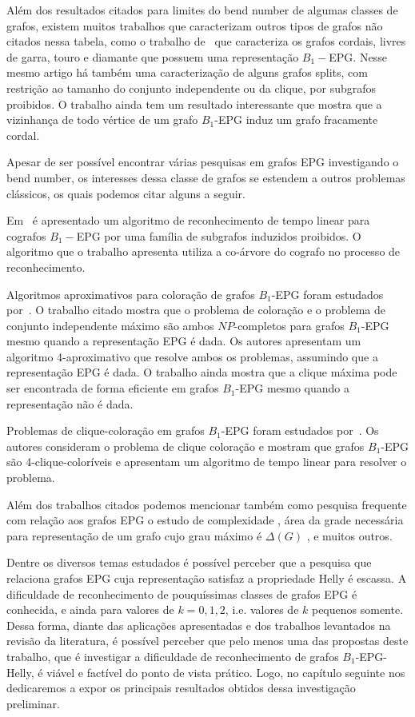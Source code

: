 Além dos resultados citados para limites do bend number de algumas classes de grafos, existem muitos trabalhos que caracterizam outros tipos de grafos não citados nessa tabela, como o trabalho de~\citep{ries2009} que caracteriza os grafos cordais, livres de garra, touro e diamante que possuem uma representação $B_{1}-$EPG. Nesse mesmo artigo há também uma caracterização de alguns grafos splits, com restrição ao tamanho do conjunto independente ou da clique, por subgrafos proibidos. O trabalho ainda tem um resultado interessante que mostra que a vizinhança de todo vértice de um grafo $B_1$-EPG induz um grafo fracamente cordal.

Apesar de ser possível encontrar várias pesquisas em grafos EPG investigando o bend number, os interesses dessa classe de grafos se estendem a outros problemas clássicos, os quais podemos citar alguns a seguir.

Em~\citet{cohen2014} é apresentado um algoritmo de reconhecimento de tempo linear para cografos $B_{1}-$EPG por uma família de subgrafos induzidos proibidos. O algoritmo que o trabalho apresenta utiliza a co-árvore do cografo no processo de reconhecimento.
 
 Algoritmos aproximativos para coloração de grafos $B_1$-EPG foram estudados por~\cite{epstein2013approximation}. O trabalho citado mostra que o problema de coloração e o problema de conjunto independente máximo são ambos $NP$-completos para grafos $B_1$-EPG mesmo quando a representação EPG é dada. Os autores apresentam um algoritmo  4-aproximativo que resolve ambos os problemas, assumindo que a representação EPG é dada. O trabalho ainda mostra que a clique máxima pode ser encontrada de forma eficiente em grafos $B_1$-EPG mesmo quando a representação não é dada.
 
 Problemas de clique-coloração em grafos $B_1$-EPG foram estudados por~\cite{bonomo2017clique}. Os autores consideram o problema de clique coloração e mostram que grafos $B_1$-EPG são 4-clique-coloríveis e apresentam um algoritmo de tempo linear para resolver o problema.

Além dos trabalhos citados podemos mencionar também como pesquisa frequente com relação aos grafos EPG o estudo de complexidade \cite{daniel2014b, martin2017}, área da grade necessária para representação de um grafo cujo grau máximo é $\Delta(G)$ \cite{Asinowski2009}, e muitos outros.

Dentre os diversos temas estudados é possível perceber que a pesquisa que relaciona grafos EPG cuja representação satisfaz a propriedade Helly é escassa.
A dificuldade de reconhecimento de pouquíssimas classes de grafos EPG é conhecida, e ainda para valores de $k=0,1,2$, i.e. valores de $k$ pequenos somente.  Dessa forma, diante das aplicações apresentadas e dos trabalhos levantados na revisão da literatura, é possível perceber que pelo menos uma das propostas deste trabalho, que é investigar a dificuldade de reconhecimento de grafos $B_1$-EPG-Helly, é viável e factível do ponto de vista prático. Logo, no capítulo seguinte nos dedicaremos a expor os principais resultados obtidos dessa investigação preliminar.

